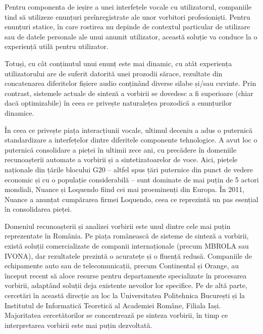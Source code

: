 \documentclass[]{../../metanetpaper}
\begin{document}
\begin{multicols}{2}
Pentru componenta de ieșire a unei interfețele vocale cu utilizatorul, companiile tind să utilizeze enunțuri preînregistrate ale unor vorbitori profesioniști. Pentru enunțuri statice, în care rostirea nu depinde de contextul particular de utilizare sau de datele personale ale unui anumit utilizator, această soluție va conduce la o experiență utilă pentru utilizator. 

Totuși, cu cât conținutul unui enunț este mai dinamic, cu atât experiența utilizatorului are de suferit datorită unei prozodii sărace, rezultate din concatenarea diferitelor fișiere audio conținând diverse silabe și/sau cuvinte. Prin contrast, sistemele actuale de sinteză a vorbirii se dovedesc a fi superioare (chiar dacă optimizabile) în ceea ce privește naturalețea prozodică a enunțurilor dinamice. 

În ceea ce privește piața interacțiunii vocale, ultimul deceniu a adus o puternică standardizare a interfețelor dintre diferitele componente tehnologice. A avut loc o puternică consolidare a pieței în ultimii zece ani, cu precădere în domeniile recunoașterii automate a vorbirii și a sintetizatoarelor de voce. Aici, piețele naționale din țările blocului G20 – altfel spus țări puternice din punct de vedere economic și cu o populație considerabilă – sunt dominate de mai puțin de 5 actori mondiali, Nuance și Loquendo fiind cei mai proeminenți din Europa. În 2011, Nuance a anunțat cumpărarea firmei Loquendo, ceea ce reprezintă un pas esențial în consolidarea pieței.

Domeniul recunoașterii și analizei vorbirii este unul dintre cele mai puțin reprezentate în România. Pe piața românească de sisteme de sinteză a vorbirii, există soluții comercializate de companii internaționale (precum MBROLA sau IVONA), dar rezultatele prezintă o acuratețe și o fluență redusă. Companiile de echipamente auto sau de telecomunicații, precum Continental și Orange, au început recent să aloce resurse pentru departamente specializate în procesarea vorbirii, adaptând soluții deja existente nevoilor lor specifice. Pe de altă parte, cercetări în această direcție au loc la Universitatea Politehnica București și la Institutul de Informatică Teoretică al Academiei Române, Filiala Iași. Majoritatea cercetătorilor se concentrează pe sinteza vorbirii, în timp ce interpretarea vorbirii este mai puțin dezvoltată.


\end{multicols}
\end{document}
